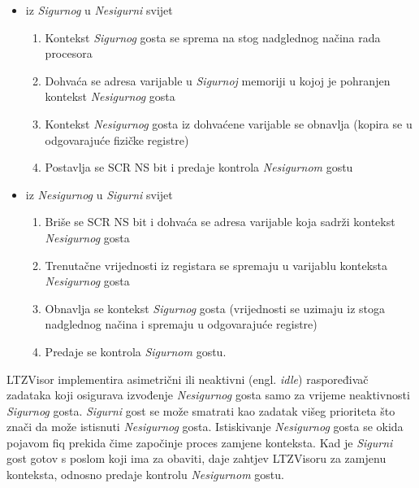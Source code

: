 \documentclass[times, utf8, diplomski, numeric]{fer}
\begin{document}
\begin{itemize}
  \item{iz \textit{Sigurnog} u \textit{Nesigurni} svijet}
      \begin{enumerate}
        \item{Kontekst \textit{Sigurnog} gosta se sprema na stog nadglednog načina rada procesora}
        \item{Dohvaća se adresa varijable u \textit{Sigurnoj} memoriji u kojoj je pohranjen kontekst \textit{Nesigurnog} gosta}
        \item{Kontekst \textit{Nesigurnog} gosta iz dohvaćene varijable se obnavlja (kopira se u odgovarajuće fizičke registre)}
        \item{Postavlja se SCR NS bit i predaje kontrola \textit{Nesigurnom} gostu}
      \end{enumerate}
  \item{iz \textit{Nesigurnog} u \textit{Sigurni} svijet}
      \begin{enumerate}
        \item{Briše se SCR NS bit i dohvaća se adresa varijable koja sadrži kontekst \textit{Nesigurnog} gosta}
        \item{Trenutačne vrijednosti iz registara se spremaju u varijablu konteksta \textit{Nesigurnog} gosta}
        \item{Obnavlja se kontekst \textit{Sigurnog} gosta (vrijednosti se uzimaju iz stoga nadglednog načina i spremaju u odgovarajuće
        registre)}
        \item{Predaje se kontrola \textit{Sigurnom} gostu.}
      \end{enumerate}
\end{itemize}
LTZVisor implementira asimetrični ili neaktivni (engl. \textit{idle}) raspoređivač zadataka koji osigurava izvođenje \textit{Nesigurnog}
gosta samo za vrijeme neaktivnosti \textit{Sigurnog} gosta. \textit{Sigurni} gost se može smatrati kao zadatak višeg prioriteta što znači
da može istisnuti \textit{Nesigurnog} gosta. Istiskivanje \textit{Nesigurnog} gosta se okida pojavom \gls{fiq} prekida čime započinje proces zamjene
konteksta. Kad je \textit{Sigurni} gost gotov s poslom koji ima za obaviti, daje zahtjev LTZVisoru za zamjenu konteksta, odnosno predaje
kontrolu \textit{Nesigurnom} gostu.
\end{document}
